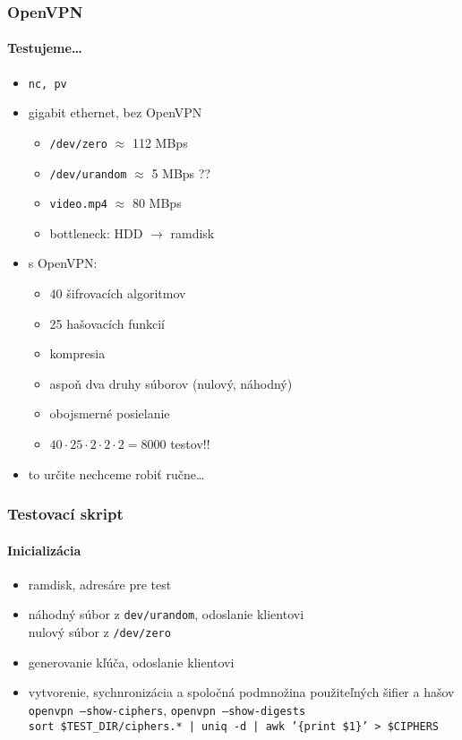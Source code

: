 \documentclass{beamer}
\begin{document}
\begin{frame}
	\frametitle{OpenVPN}
	\framesubtitle{Testujeme\dots}
	\begin{itemize}
		\item \texttt{nc, pv}
		\item gigabit ethernet, bez OpenVPN
			\begin{itemize}
				\item \texttt{/dev/zero} $\approx$ 112 MBps
				\item \texttt{/dev/urandom} $\approx$ 5 MBps ??
				\item \texttt{video.mp4} $\approx$ 80 MBps
				\item bottleneck: HDD $\rightarrow$ ramdisk
			\end{itemize}
		\bigskip
		\item s OpenVPN:
			\begin{itemize}
				\item 40 šifrovacích algoritmov
				\item 25 hašovacích funkcií
				\item kompresia
				\item aspoň dva druhy súborov (nulový, náhodný)
				\item obojsmerné posielanie
				\item $40 \cdot 25 \cdot 2 \cdot 2 \cdot 2 = 8000$ testov!!
			\end{itemize}
		\item to určite nechceme robiť ručne\dots
	\end{itemize}
\end{frame}

\begin{frame}
	\frametitle{Testovací skript}
	\framesubtitle{Inicializácia}
	\begin{itemize}
		\item ramdisk, adresáre pre test
		\item náhodný súbor z \texttt{dev/urandom}, odoslanie klientovi\\
			 nulový súbor z \texttt{/dev/zero}
		\item generovanie kľúča, odoslanie klientovi
		\item vytvorenie, sychnronizácia a spoločná podmnožina použiteľných šifier a hašov\\
			\bigskip
			{\small
			\texttt{openvpn --show-ciphers}, \texttt{openvpn --show-digests}\\
			\texttt{sort \$TEST\_DIR/ciphers.* | uniq -d | awk '\{print \$1\}' > \$CIPHERS}}
	\end{itemize}
\end{frame}
\end{document}
